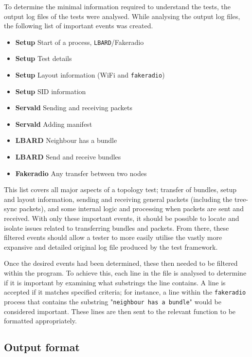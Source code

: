 To determine the minimal information required to understand the tests, the output log files of the tests were analysed.
While analysing the output log files, the following list of important events was created.
\begin{itemize}
    \item \textbf{Setup} Start of a process, \texttt{LBARD}/Fakeradio
    \item \textbf{Setup} Test details
    \item \textbf{Setup} Layout information (WiFi and \texttt{fakeradio})
    \item \textbf{Setup} SID information
    \item \textbf{Servald} Sending and receiving packets
    \item \textbf{Servald} Adding manifest
    \item \textbf{LBARD} Neighbour has a bundle
    \item \textbf{LBARD} Send and receive bundles
    \item \textbf{Fakeradio} Any transfer between two nodes
\end{itemize}

This list covers all major aspects of a topology test; transfer of bundles, setup and layout information, sending and receiving general packets (including the tree-sync packets), and some internal logic and processing when packets are sent and received.
With only these important events, it should be possible to locate and isolate issues related to transferring bundles and packets. 
From there, these filtered events should allow a tester to more easily utilise the vastly more expansive and detailed original log file produced by the test framework. 

Once the desired events had been determined, these then needed to be filtered within the program.
To achieve this, each line in the file is analysed to determine if it is important by examining what substrings the line contains.
A line is accepted if it matches specified criteria; for instance, a line within the \texttt{fakeradio} process that contains the substring "\texttt{neighbour has a bundle}" would be considered important. 
These lines are then sent to the relevant function to be formatted appropriately.

\subsection{Output format}

